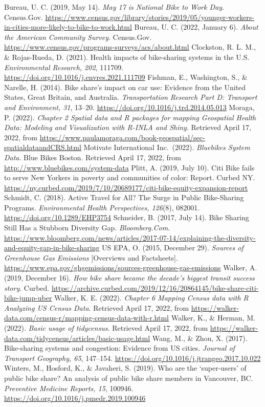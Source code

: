 \documentclass[
  12pt,
]{article}
\begin{document}
Bureau, U. C. (2019, May 14). \emph{May 17 is National Bike to Work
Day}. Census.Gov.
\url{https://www.census.gov/library/stories/2019/05/younger-workers-in-cities-more-likely-to-bike-to-work.html}
Bureau, U. C. (2022, January 6). \emph{About the American Community
Survey}. Census.Gov.
\url{https://www.census.gov/programs-surveys/acs/about.html} Clockston,
R. L. M., \& Rojas-Rueda, D. (2021). Health impacts of bike-sharing
systems in the U.S. \emph{Environmental Research, 202}, 111709.
\url{https://doi.org/10.1016/j.envres.2021.111709} Fishman, E.,
Washington, S., \& Narelle, H. (2014). Bike share's impact on car use:
Evidence from the United States, Great Britain, and Australia.
\emph{Transportation Research Part D: Transport and Environment, 31},
13--20. \url{https://doi.org/10.1016/j.trd.2014.05.013} Moraga, P.
(2022). \emph{Chapter 2 Spatial data and R packages for mapping
\textbar{} Geospatial Health Data: Modeling and Visualization with
R-INLA and Shiny}. Retrieved April 17, 2022, from
\url{https://www.paulamoraga.com/book-geospatial/sec-spatialdataandCRS.html}
Motivate International Inc.~(2022). \emph{Bluebikes System Data}. Blue
Bikes Boston. Retrieved April 17, 2022, from
\url{http://www.bluebikes.com/system-data} Plitt, A. (2019, July 10).
Citi Bike fails to serve New Yorkers in poverty and communities of
color: Report. Curbed NY.
\url{https://ny.curbed.com/2019/7/10/20689177/citi-bike-equity-expansion-report}
Schmidt, C. (2018). Active Travel for All? The Surge in Public
Bike-Sharing Programs. \emph{Environmental Health Perspectives, 126}(8),
082001. \url{https://doi.org/10.1289/EHP3754} Schneider, B. (2017, July
14). Bike Sharing Still Has a Stubborn Diversity Gap.
\emph{Bloomberg.Com}.
\url{https://www.bloomberg.com/news/articles/2017-07-14/explaining-the-diversity-and-equity-gap-in-bike-sharing}
US EPA, O. (2015, December 29). \emph{Sources of Greenhouse Gas
Emissions} {[}Overviews and Factsheets{]}.
\url{https://www.epa.gov/ghgemissions/sources-greenhouse-gas-emissions}
Walker, A. (2019, December 16). \emph{How bike share became the decade's
biggest transit success story}. Curbed.
\url{https://archive.curbed.com/2019/12/16/20864145/bike-share-citi-bike-jump-uber}
Walker, K. E. (2022). \emph{Chapter 6 Mapping Census data with R
\textbar{} Analyzing US Census Data}. Retrieved April 17, 2022, from
\url{https://walker-data.com/census-r/mapping-census-data-with-r.html}
Walker, K., \& Herman, M. (2022). \emph{Basic usage of tidycensus}.
Retrieved April 17, 2022, from
\url{https://walker-data.com/tidycensus/articles/basic-usage.html} Wang,
M., \& Zhou, X. (2017). Bike-sharing systems and congestion: Evidence
from US cities. \emph{Journal of Transport Geography, 65}, 147--154.
\url{https://doi.org/10.1016/j.jtrangeo.2017.10.022} Winters, M.,
Hosford, K., \& Javaheri, S. (2019). Who are the `super-users' of public
bike share? An analysis of public bike share members in Vancouver, BC.
\emph{Preventive Medicine Reports, 15}, 100946.
\url{https://doi.org/10.1016/j.pmedr.2019.100946}
\end{document}
